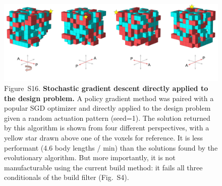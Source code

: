 \begin{figure}[t]
\centering
\includegraphics[width=\linewidth]{Chapter07/img/sgd.png}
\caption*{Figure~S16.  \textbf{Stochastic gradient descent directly applied to the design problem.} 
A policy gradient method \cite{sehnke2010parameter} was paired with a popular SGD optimizer \cite{kingma2014adam} and directly applied to the design problem given a random actuation pattern (seed=1). 
The solution returned by this algorithm is shown from four different perspectives, with a yellow star drawn above one of the voxels for reference. 
It is less performant (4.6 body lengths / min) than the solutions found by the evolutionary algorithm. But more importantly, it is not manufacturable using the current build method: it fails all three conditionals of the build filter (Fig.~S4).
}
\end{figure}

